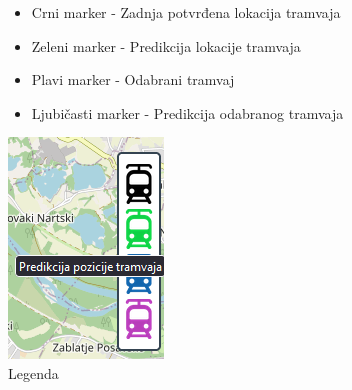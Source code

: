 \documentclass[zavrsnirad]{fer}
\begin{document}
\begin{figure}[H]
	\centering
	\begin{minipage}[b]{0.68\textwidth}
		\begin{itemize}
			\item Crni marker - Zadnja potvrđena lokacija tramvaja
			\item Zeleni marker - Predikcija lokacije tramvaja
			\item Plavi marker - Odabrani tramvaj
			\item Ljubičasti marker - Predikcija odabranog tramvaja
		\end{itemize}
	\end{minipage}
	\hfill
	\begin{minipage}[c]{0.24\textwidth}
		\centering
		\includegraphics[width=\textwidth]{Figures/legenda.png}
		\caption{Legenda}
		\label{slk:legenda}
	\end{minipage}
\end{figure}
\end{document}
